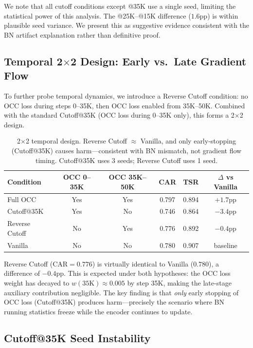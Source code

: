 \documentclass[10pt,letterpaper]{article}
\begin{document}
We note that all cutoff conditions except @35K use a single seed, limiting the statistical power of this analysis. The @25K--@15K difference ($1.6$pp) is within plausible seed variance. We present this as suggestive evidence consistent with the BN artifact explanation rather than definitive proof.

\subsection{Temporal 2$\times$2 Design: Early vs.\ Late Gradient Flow}
\label{sec:temporal}

To further probe temporal dynamics, we introduce a Reverse Cutoff condition: no OCC loss during steps 0--35K, then OCC loss enabled from 35K--50K. Combined with the standard Cutoff@35K (OCC loss during 0--35K only), this forms a 2$\times$2 design.

\begin{table}[h]
\centering
\caption{2$\times$2 temporal design. Reverse Cutoff $\approx$ Vanilla, and only early-stopping (Cutoff@35K) causes harm---consistent with BN mismatch, not gradient flow timing. Cutoff@35K uses 3 seeds; Reverse Cutoff uses 1 seed.}
\label{tab:temporal}
\begin{tabular}{lccccc}
\toprule
\textbf{Condition} & \textbf{OCC 0--35K} & \textbf{OCC 35K--50K} & \textbf{CAR} & \textbf{TSR} & \textbf{$\Delta$ vs Vanilla} \\
\midrule
Full OCC       & Yes & Yes & 0.797 & 0.894 & $+1.7$pp \\
Cutoff@35K     & Yes & No  & 0.746 & 0.864 & $-3.4$pp \\
Reverse Cutoff & No  & Yes & 0.776 & 0.892 & $-0.4$pp \\
Vanilla        & No  & No  & 0.780 & 0.907 & baseline \\
\bottomrule
\end{tabular}
\end{table}

Reverse Cutoff ($\text{CAR} = 0.776$) is virtually identical to Vanilla ($0.780$), a difference of $-0.4$pp. This is expected under both hypotheses: the OCC loss weight has decayed to $w(35\text{K}) \approx 0.005$ by step 35K, making the late-stage auxiliary contribution negligible. The key finding is that \emph{only} early stopping of OCC loss (Cutoff@35K) produces harm---precisely the scenario where BN running statistics freeze while the encoder continues to update.

\subsection{Cutoff@35K Seed Instability}
\label{sec:cutoff_instability}
\end{document}
